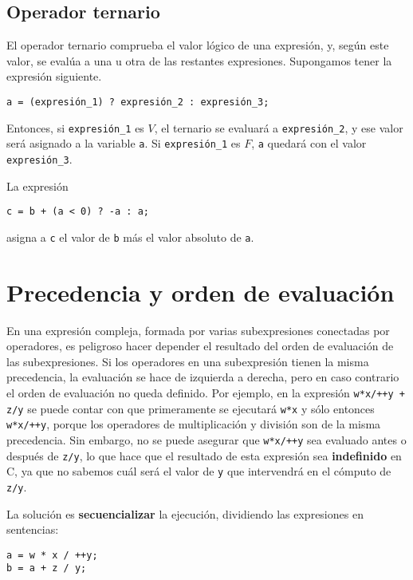 \subsection{Operador ternario}
El operador ternario comprueba el valor lógico de una expresión, y, según este valor, se evalúa a una u otra de las restantes expresiones. Supongamos tener la expresión siguiente.

\begin{lstlisting}
a = (expresión_1) ? expresión_2 : expresión_3;    
\end{lstlisting}

Entonces, si \lstinline{expresión_1} es $V$, el ternario se evaluará a \lstinline{expresión_2}, y ese valor será asignado a la variable \lstinline{a}. Si \lstinline{expresión_1} es $F$, \lstinline{a} quedará con el valor \lstinline{expresión_3}.

\begin{ejemplo}
La expresión
\begin{lstlisting}
c = b + (a < 0) ? -a : a;   
\end{lstlisting}      
asigna a \lstinline{c} el valor de \lstinline{b} más el valor absoluto de \lstinline{a}.
\end{ejemplo}

\section{Precedencia y orden de evaluación}

En una expresión compleja, formada por varias subexpresiones conectadas por operadores, es peligroso hacer depender el resultado del orden de evaluación de las subexpresiones. Si los operadores en una subexpresión tienen la misma precedencia, la evaluación se hace de izquierda a derecha, pero en caso contrario el orden de evaluación no queda definido. 
Por ejemplo, en la expresión \lstinline{w*x/++y + z/y} se puede contar con que primeramente se ejecutará \lstinline{w*x} y sólo entonces \lstinline{w*x/++y}, porque los operadores de multiplicación y división son de la misma precedencia. Sin embargo, no se puede asegurar que \lstinline{w*x/++y} sea evaluado antes o después de \lstinline{z/y}, lo que hace que el resultado de esta expresión sea \textbf{indefinido} en C, ya que no sabemos cuál será el valor de \lstinline{y} que intervendrá en el cómputo de \lstinline{z/y}. 

La solución es \textbf{secuencializar} la ejecución, dividiendo las expresiones en sentencias:
\begin{lstlisting}
a = w * x / ++y;
b = a + z / y;     	
\end{lstlisting}
 
